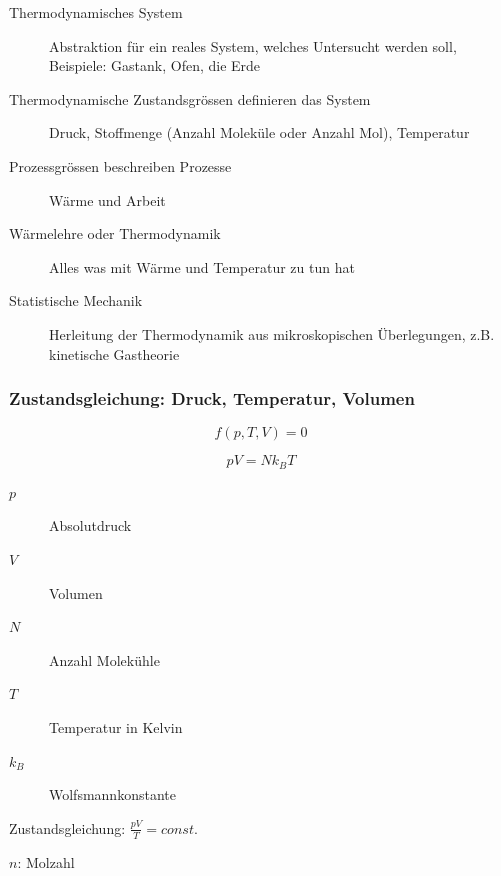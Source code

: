 \documentclass[a4paper]{scrartcl}
\begin{document}
\begin{description}
	\item[Thermodynamisches System] Abstraktion für ein reales System, welches Untersucht werden soll, Beispiele: Gastank, Ofen, die Erde
	\item[Thermodynamische Zustandsgrössen definieren das System] Druck, Stoffmenge (Anzahl Moleküle oder Anzahl Mol), Temperatur
	\item[Prozessgrössen beschreiben Prozesse] Wärme und Arbeit
	\item[Wärmelehre oder Thermodynamik] Alles was mit Wärme und Temperatur zu tun hat
	\item[Statistische Mechanik] Herleitung der Thermodynamik aus mikroskopischen Überlegungen, z.B. kinetische Gastheorie
\end{description}


\subsubsection{Zustandsgleichung: Druck, Temperatur, Volumen}


\[
	f(p, T, V) = 0
\]



\[
p V = N k_B T
\]


\begin{description}
	\item[$p$] Absolutdruck
	\item[$V$] Volumen	
	\item[$N$] Anzahl Molekühle
	\item[$T$] Temperatur in Kelvin
	\item[$k_B$] Wolfsmannkonstante
\end{description}

Zustandsgleichung: $\frac{pV}{T} = const.$



$n$: Molzahl
\end{document}
